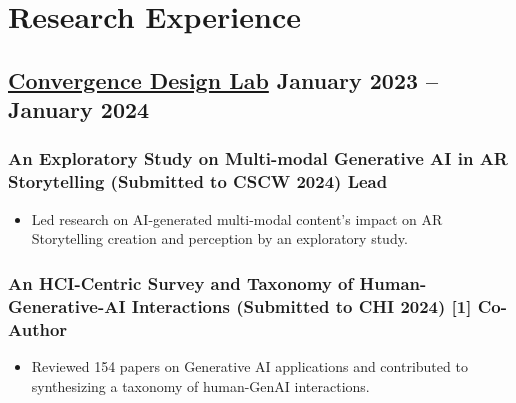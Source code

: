 \section{Research Experience}
\subsection{{\href{https://engineering.purdue.edu/cdesign/wp/}{Convergence Design Lab} \hfill January 2023 – January 2024 }}
\subsubsection*{\footnotesize An Exploratory Study on Multi-modal Generative AI in AR Storytelling (Submitted to CSCW 2024) \hfill Lead} 
\vspace{-0.5em}
\begin{itemize}
    \setlength\itemsep{-0.5em}
    \item \small Led research on AI-generated multi-modal content's impact on AR Storytelling creation and perception by an exploratory study.
\end{itemize}

\vspace{-2em}
\subsubsection*{\footnotesize An HCI-Centric Survey and Taxonomy of Human-Generative-AI Interactions (Submitted to CHI 2024) [1] \hfill Co-Author}
\vspace{-0.5em}
\begin{itemize}
    \setlength\itemsep{-0.5em}
    \item \small Reviewed 154 papers on Generative AI applications and contributed to synthesizing a taxonomy of human-GenAI interactions.
\end{itemize}

